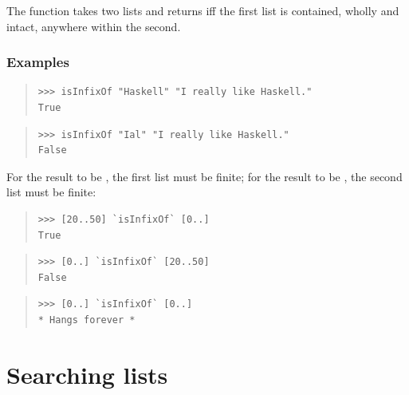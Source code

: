 \begin{haddockdesc}
\item[\begin{tabular}{@{}l}
isInfixOf :: Eq a => {\char 91}a{\char 93} -> {\char 91}a{\char 93} -> Bool
\end{tabular}]
{\haddockbegindoc
The  function takes two lists and returns 
 iff the first list is contained, wholly and intact,
 anywhere within the second.\par
\subsubsection*{\textbf{Examples}}
\begin{quote}
{\haddockverb\begin{verbatim}
>>> isInfixOf "Haskell" "I really like Haskell."
True

\end{verbatim}}
\end{quote}
\begin{quote}
{\haddockverb\begin{verbatim}
>>> isInfixOf "Ial" "I really like Haskell."
False

\end{verbatim}}
\end{quote}
For the result to be , the first list must be finite;
 for the result to be , the second list must be finite:\par
\begin{quote}
{\haddockverb\begin{verbatim}
>>> [20..50] `isInfixOf` [0..]
True

\end{verbatim}}
\end{quote}
\begin{quote}
{\haddockverb\begin{verbatim}
>>> [0..] `isInfixOf` [20..50]
False

\end{verbatim}}
\end{quote}
\begin{quote}
{\haddockverb\begin{verbatim}
>>> [0..] `isInfixOf` [0..]
* Hangs forever *

\end{verbatim}}
\end{quote}}
\end{haddockdesc}
\section{Searching lists}
